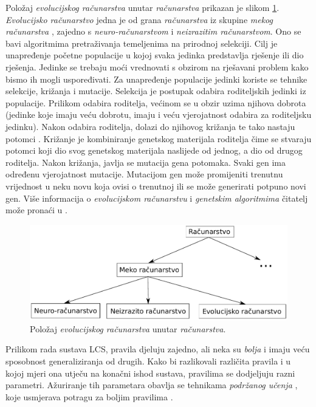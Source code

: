 \documentclass[times, utf8, zavrsni]{fer}
\begin{document}
Položaj \emph{evolucijskog računarstva} unutar \emph{računarstva} prikazan je slikom \ref{img:racpol}.
\emph{Evolucijsko računarstvo} jedna je od grana \emph{računarstva} iz skupine \emph{mekog računarstva} , zajedno s \emph{neuro-računarstvom} i \emph{neizrazitim računarstvom}.
Ono se bavi algoritmima pretraživanja temeljenima na prirodnoj selekciji.
Cilj je unapređenje početne populacije u kojoj svaka jedinka predstavlja rješenje ili dio rješenja.
Jedinke se trebaju moći vrednovati s obzirom na rješavani problem kako bismo ih mogli uspoređivati.
Za unapređenje populacije jedinki koriste se tehnike selekcije, križanja i mutacije.
Selekcija je postupak odabira roditeljskih jedinki iz populacije.
Prilikom odabira roditelja, većinom se u obzir uzima njihova dobrota (jedinke koje imaju veću dobrotu, imaju i veću vjerojatnost odabira za roditeljsku jedinku).
Nakon odabira roditelja, dolazi do njihovog križanja te tako nastaju potomci .
Križanje je kombiniranje genetskog materijala roditelja čime se stvaraju potomci koji dio svog genetskog materijala naslijede od jednog, a dio od drugog roditelja.
Nakon križanja, javlja se mutacija gena potomaka.
Svaki gen ima određenu vjerojatnost mutacije.
Mutacijom gen može promijeniti trenutnu vrijednost u neku novu koja ovisi o trenutnoj ili se može generirati potpuno novi gen.
Više informacija o \emph{evolucijskom računarstvu} i \emph{genetskim algoritmima} čitatelj može pronaći u \citep{6}.
\begin{figure}[!h]
    \centering
    \includegraphics[width=\textwidth]{img/racpol.pdf}
    \caption{Položaj \emph{evolucijskog računarstva} unutar \emph{računarstva}.}
    \label{img:racpol}
\end{figure}

Prilikom rada sustava LCS, pravila djeluju zajedno, ali neka su \emph{bolja} i imaju veću sposobnost generaliziranja od drugih.
Kako bi razlikovali različita pravila i u kojoj mjeri ona utječu na konačni ishod sustava, pravilima se dodjeljuju razni parametri.
Ažuriranje tih parametara obavlja se tehnikama \emph{podržanog učenja} , koje usmjerava potragu za boljim pravilima \citep{3}.
\end{document}
